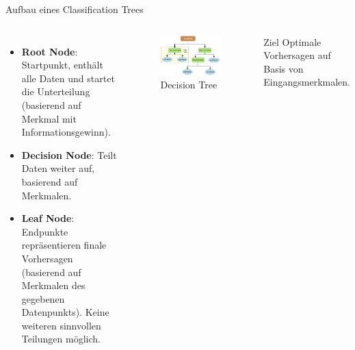 \documentclass{beamer}
\begin{document}
\begin{frame}{Aufbau eines Classification Trees}

	\begin{columns}
			\begin{itemize}
				\item {\textbf{Root Node}: Startpunkt, enthält alle Daten und startet die Unterteilung (basierend auf Merkmal mit Informationsgewinn).}
				\item {\textbf{Decision Node}: Teilt Daten weiter auf, basierend auf Merkmalen.}
				\item {\textbf{Leaf Node}: Endpunkte repräsentieren finale Vorhersagen (basierend auf Merkmalen des gegebenen Datenpunkts). Keine weiteren sinnvollen Teilungen möglich.}
			\end{itemize}	
			
			\begin{figure}
				\includegraphics[width=\linewidth]{Images/tree.png}
				\caption{Decision Tree \cite{Charbuty2021ClassificationBO}}
			\end{figure}
			
			\pause
			\begin{alertblock}{Ziel}
				Optimale Vorhersagen auf Basis von Eingangsmerkmalen.			
			\end{alertblock}
	\end{columns}

\end{frame}
\end{document}
